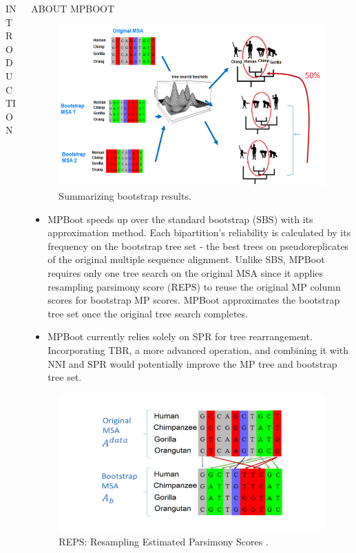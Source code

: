 \documentclass[%
  final,%
  english,%
]{beamer}
\begin{document}
\begin{frame}[t, fragile = singleslide]
\begin{columns}[t, onlytextwidth]
\begin{column}{0.49\textwidth}
\begin{block}{INTRODUCTION}
\end{block}
%
\end{column}
%
\begin{column}{0.48\textwidth}
\vspace{-0.9cm}
\begin{block}{ABOUT MPBOOT}

\begin{figure}[!htb]
\centering%
\includegraphics[width = 0.8\columnwidth]{./Figuras/mpboot.png}
\caption{Summarizing bootstrap results.}%
\end{figure}

\begin{itemize}
\item MPBoot speeds up over the standard bootstrap (SBS) \cite{10.2307/2408678} with its approximation method. Each bipartition's reliability is calculated by its frequency on the bootstrap tree set - the best trees on pseudoreplicates of the original multiple sequence alignment. Unlike SBS, MPBoot requires only one tree search on the original MSA since it applies resampling parsimony score (REPS) to reuse the original MP column scores for bootstrap MP scores. MPBoot approximates the bootstrap tree set once the original tree search completes.
\item MPBoot currently relies solely on SPR for tree rearrangement. Incorporating TBR, a more advanced operation, and combining it with NNI and SPR would potentially improve the MP tree and bootstrap tree set.
\end{itemize}

\begin{figure}[!htb]
\centering%
\includegraphics[width = 0.6\columnwidth]{./Figuras/REPS.png}
\caption{REPS: Resampling Estimated Parsimony Scores
.}%
\end{figure}


\end{block}
\end{column}
\end{columns}
\end{frame}
\end{document}
